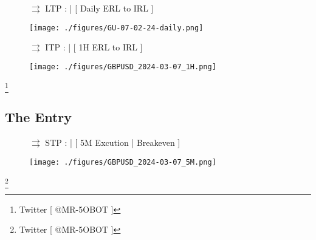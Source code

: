 \documentclass{article}
\begin{document}
\begin{figure}[h]
\begin{notebox}
\noindent \( \rightrightarrows \) \hspace{0.1cm}LTP : | [ Daily ERL to IRL ] 

  \begin{center}
    \texttt{[image: ./figures/GU-07-02-24-daily.png]}
  \end{center}
\end{notebox}

\begin{notebox}
   \( \rightrightarrows \) \hspace{0.1cm}ITP : | [ 1H ERL to IRL ]

  \begin{center}
    \texttt{[image: ./figures/GBPUSD\_2024-03-07\_1H.png]}
  \end{center}
\end{notebox}
\end{figure}

\footnote{Twitter [ @MR-5OBOT ]}
\newpage

\subsection{The Entry}
\begin{figure}[h]
\begin{notebox}
  \( \rightrightarrows \) \hspace{0.1cm}STP : | [ 5M Excution | Breakeven ]
   \begin{center}
    \texttt{[image: ./figures/GBPUSD\_2024-03-07\_5M.png]}
  \end{center}
\end{notebox}
\end{figure}

\footnote{Twitter [ @MR-5OBOT ]}
\end{document}
